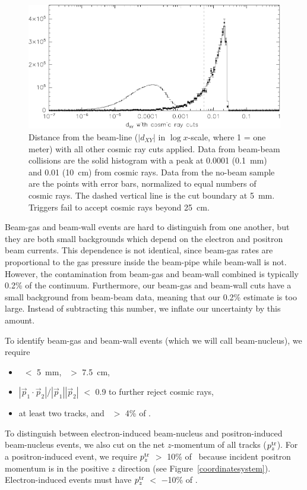 \documentclass{cornell}
\begin{document}
\begin{figure}[p]
  \begin{center}
    \includegraphics[width=\linewidth]{plots/dxydzcontaminationa}
  \end{center}
  \caption{\label{dxydzcontaminationa} Distance from the beam-line
  ($|d_{XY}|$ in $\log x$-scale, where 1 = one meter) with all other
  cosmic ray cuts applied.  Data from beam-beam collisions are the
  solid histogram with a peak at 0.0001 (0.1~mm) and 0.01 (10~cm) from
  cosmic rays.  Data from the no-beam sample are the points with error
  bars, normalized to equal numbers of cosmic rays.  The dashed
  vertical line is the cut boundary at 5~mm.  Triggers fail to accept
  cosmic rays beyond 25~cm.}
\end{figure}

Beam-gas and beam-wall events are hard to distinguish from one
another, but they are both small backgrounds which depend on the
electron and positron beam currents.  This dependence is not
identical, since beam-gas rates are proportional to the gas pressure
inside the beam-pipe while beam-wall is not.  However, the
contamination from beam-gas and beam-wall combined is typically 0.2\%
of the continuum.  Furthermore, our beam-gas and beam-wall cuts have a
small background from beam-beam data, meaning that our 0.2\% estimate
is too large.  Instead of subtracting this number, we inflate our
uncertainty by this amount.

To identify beam-gas and beam-wall events (which we will call
beam-nucleus), we require
\begin{itemize}

  \item \dxy\ $<$ 5~mm, \dz\ $>$ 7.5~cm,

  \item $|\vec{p}_1 \cdot \vec{p}_2| / |\vec{p}_1| |\vec{p}_2|$ $<$
    0.9 to further reject cosmic rays,

  \item at least two tracks, and \visen\ $>$ 4\% of \ecm.

\end{itemize}
To distinguish between electron-induced beam-nucleus and
positron-induced beam-nucleus events, we also cut on the net
$z$-momentum of all tracks ($p_z^{\mbox{\scriptsize tr}}$).  For a positron-induced
event, we require $p_z^{\mbox{\scriptsize tr}}$ $>$ 10\% of \ebeam\ because incident
positron momentum is in the positive $z$ direction (see Figure~\ref{coordinatesystem}).  Electron-induced events must have
$p_z^{\mbox{\scriptsize tr}}$ $<$ $-$10\% of \ebeam.
\end{document}
